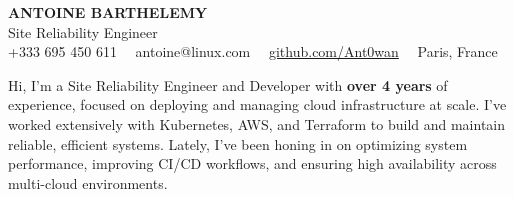 \documentclass[10pt]{developercv}
\begin{document}
\begin{center}
    {\huge\textbf{\MakeUppercase{Antoine Barthelemy}}} \\
    \vspace{3pt}
    {\LARGE Site Reliability Engineer} \\
    \vspace{3pt}
	+333 695 450 611 \ \ antoine@linux.com \ \ \href{https://github.com/Ant0wan}{github.com/Ant0wan} \ \ Paris, France
\end{center}

\hspace{0pt}
\begin{minipage}[t]{1.00\textwidth}
\vspace{-6pt}
{Hi, I’m a Site Reliability Engineer and Developer with \textbf{over 4 years} of experience, focused on deploying and managing cloud infrastructure at scale. I’ve worked extensively with Kubernetes, AWS, and Terraform to build and maintain reliable, efficient systems. Lately, I’ve been honing in on optimizing system performance, improving CI/CD workflows, and ensuring high availability across multi-cloud environments.}
\end{minipage}
\vspace{3pt}
\hfill

\end{document}
